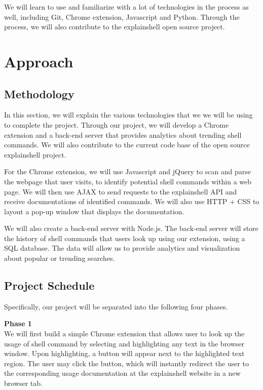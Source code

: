\documentclass[11pt]{article}
\begin{document}
We will learn to use and familiarize with a lot of technologies in the process as well, including Git, Chrome extension, Javascript and Python. Through the process, we will also contribute to the explainshell open source project.

\section{Approach}
\subsection{Methodology}

In this section, we will explain the various technologies that we we will be using to complete the project. Through our project, we will develop a Chrome extension and a back-end server that provides analytics about trending shell commands. We will also contribute to the current code base of the open source explainshell project. 

For the Chrome extension, we will use Javascript and jQuery to scan and parse the webpage that user visits, to identify potential shell commands within a web page. We will then use AJAX to send requests to the explainshell API and receive documentations of identified commands. We will also use HTTP + CSS to layout a pop-up window that displays the documentation. 

We will also create a back-end server with Node.js. The back-end server will store the history of shell commands that users look up using our extension, using a SQL database. The data will allow us to provide analytics and visualization about popular or trending searches.

\subsection{Project Schedule}
Specifically, our project will be separated into the following four phases. 

\par{\bf Phase 1}\\ 
We will first build a simple Chrome extension that allows user to look up the usage of shell command by selecting and highlighting any text in the browser window. Upon highlighting, a button will appear next to the highlighted text region. The user may click the button, which will instantly redirect the user to the corresponding usage documentation at the explainshell website in a new browser tab.
\end{document}
